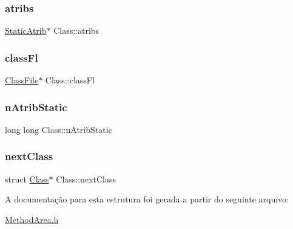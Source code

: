 \subsubsection{\texorpdfstring{atribs}{atribs}}
{\footnotesize\ttfamily \hyperlink{structStaticAtrib}{Static\+Atrib}$\ast$ Class\+::atribs}

\mbox{\label{structClass_a13dbcdd95b80b2c8fbd266a656ca927a}} 
\subsubsection{\texorpdfstring{class\+Fl}{classFl}}
{\footnotesize\ttfamily \hyperlink{structClassFile}{Class\+File}$\ast$ Class\+::class\+Fl}

\mbox{\label{structClass_a8af3ca1a9103400ec8118948464edad0}} 
\subsubsection{\texorpdfstring{n\+Atrib\+Static}{nAtribStatic}}
{\footnotesize\ttfamily long long Class\+::n\+Atrib\+Static}

\mbox{\label{structClass_a79ceca419d487e69bc791a3c2e1a96f2}} 
\subsubsection{\texorpdfstring{next\+Class}{nextClass}}
{\footnotesize\ttfamily struct \hyperlink{structClass}{Class}$\ast$ Class\+::next\+Class}



A documentação para esta estrutura foi gerada a partir do seguinte arquivo\+:\begin{DoxyCompactItemize}
\item 
\hyperlink{MethodArea_8h}{Method\+Area.\+h}\end{DoxyCompactItemize}
